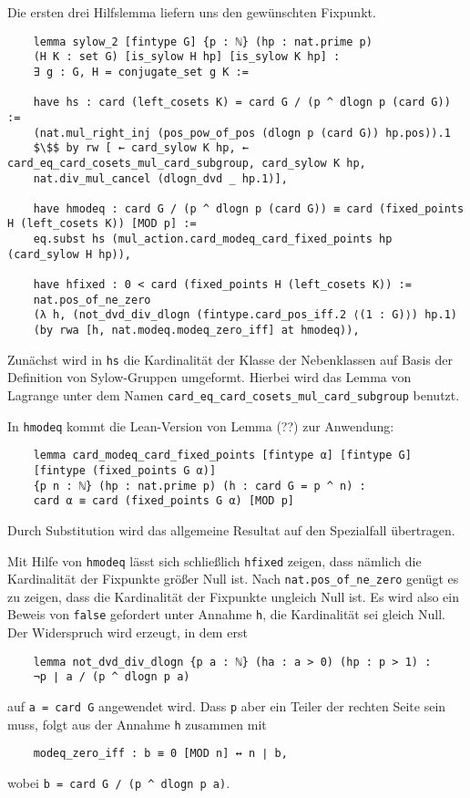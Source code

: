 \documentclass[a4paper,12pt]{scrartcl}
\newcommand{\ls}[1]{\lstinline|#1|}
\begin{document}
	Die ersten drei Hilfslemma liefern uns den gewünschten Fixpunkt.
	\begin{lstlisting}
	lemma sylow_2 [fintype G] {p : ℕ} (hp : nat.prime p)
	(H K : set G) [is_sylow H hp] [is_sylow K hp] :
	∃ g : G, H = conjugate_set g K :=
	
	have hs : card (left_cosets K) = card G / (p ^ dlogn p (card G)) := 
	(nat.mul_right_inj (pos_pow_of_pos (dlogn p (card G)) hp.pos)).1
	$\$$ by rw [ ← card_sylow K hp, ← card_eq_card_cosets_mul_card_subgroup, card_sylow K hp, 
	nat.div_mul_cancel (dlogn_dvd _ hp.1)],
	
	have hmodeq : card G / (p ^ dlogn p (card G)) ≡ card (fixed_points H (left_cosets K)) [MOD p] := 
	eq.subst hs (mul_action.card_modeq_card_fixed_points hp (card_sylow H hp)),
	
	have hfixed : 0 < card (fixed_points H (left_cosets K)) := 
	nat.pos_of_ne_zero 
	(λ h, (not_dvd_div_dlogn (fintype.card_pos_iff.2 ⟨(1 : G)⟩) hp.1) 
	(by rwa [h, nat.modeq.modeq_zero_iff] at hmodeq)),
	\end{lstlisting}
	Zunächst wird in \lstinline|hs| die Kardinalität der Klasse der Nebenklassen auf Basis der Definition von Sylow-Gruppen umgeformt. Hierbei wird das Lemma von Lagrange unter dem Namen \ls{card_eq_card_cosets_mul_card_subgroup} benutzt.
	
	In \ls{hmodeq} kommt die Lean-Version von Lemma (??) zur Anwendung: 
	\begin{lstlisting}
	lemma card_modeq_card_fixed_points [fintype α] [fintype G] 
	[fintype (fixed_points G α)]
	{p n : ℕ} (hp : nat.prime p) (h : card G = p ^ n) : 
	card α ≡ card (fixed_points G α) [MOD p]
	\end{lstlisting}
	Durch Substitution wird das allgemeine Resultat auf den Spezialfall übertragen.
	
	Mit Hilfe von \ls{hmodeq} lässt sich schließlich \ls{hfixed} zeigen, dass nämlich die Kardinalität der Fixpunkte größer Null ist. Nach \ls{nat.pos_of_ne_zero} genügt es zu zeigen, dass die Kardinalität der Fixpunkte ungleich Null ist. Es wird also ein Beweis von \ls{false} gefordert unter Annahme \ls{h}, die Kardinalität sei gleich Null. Der Widerspruch wird erzeugt, in dem erst 
	\begin{lstlisting}	
	lemma not_dvd_div_dlogn {p a : ℕ} (ha : a > 0) (hp : p > 1) : 
	¬p ∣ a / (p ^ dlogn p a)
	\end{lstlisting}
	auf \ls{a = card G} angewendet wird. Dass \ls{p} aber ein Teiler der rechten Seite sein muss, folgt aus der Annahme \ls{h} zusammen mit
	\begin{lstlisting}
	modeq_zero_iff : b ≡ 0 [MOD n] ↔ n ∣ b,
	\end{lstlisting}
	wobei \ls{b = card G / (p ^ dlogn p a)}.
	
\end{document}

